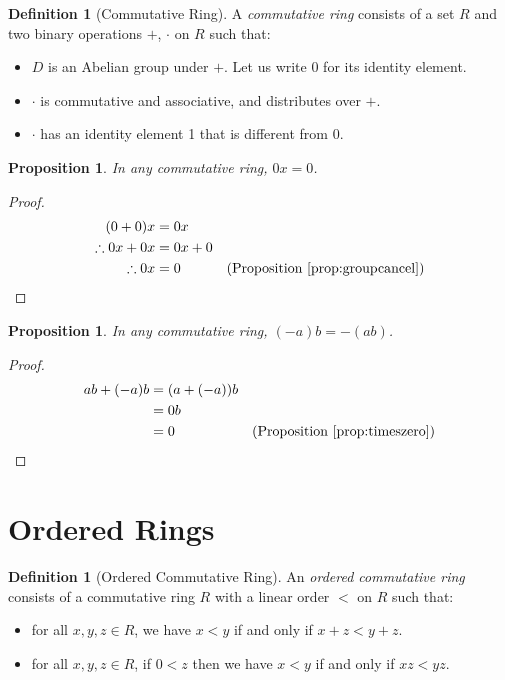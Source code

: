 \documentclass{book}
\let\qed\relax
\newtheorem{prop}[ax]{Proposition}
\theoremstyle{definition}
\newtheorem{df}[ax]{Definition}
\begin{document}
\begin{df}[Commutative Ring]
A \emph{commutative ring} consists of a set $R$ and two binary operations $+$, $\cdot$ on $R$ such that:
\begin{itemize}
\item
$D$ is an Abelian group under $+$. Let us write 0 for its identity element.
\item
$\cdot$ is commutative and associative, and distributes over $+$.
\item
$\cdot$ has an identity element 1 that is different from 0.
\end{itemize}
\end{df}

\begin{prop}
\label{prop:timeszero}
In any commutative ring, $0x = 0$.
\end{prop}

\begin{proof}
\pf
\begin{align*}
(0+0)x & = 0x \\
\therefore 0x + 0x & = 0x + 0 \\
\therefore 0x & = 0 & (\text{Proposition \ref{prop:groupcancel}}) \qed
\end{align*}
\end{proof}

\begin{prop}
In any commutative ring, $(-a)b = -(ab)$.
\end{prop}

\begin{proof}
\pf
\begin{align*}
ab + (-a)b & = (a + (-a))b \\
& = 0b \\
& = 0 & (\text{Proposition \ref{prop:timeszero}}) \qed
\end{align*}
\end{proof}

\section{Ordered Rings}

\begin{df}[Ordered Commutative Ring]
An \emph{ordered commutative ring} consists of a commutative ring $R$ with a linear order $<$ on $R$ such that:
\begin{itemize}
\item for all $x,y,z \in R$, we have $x < y$ if and only if $x + z < y + z$.
\item for all $x,y,z \in R$, if $0 < z$ then we have $x < y$ if and only if $xz < yz$.
\end{itemize}
\end{df}
\end{document}
